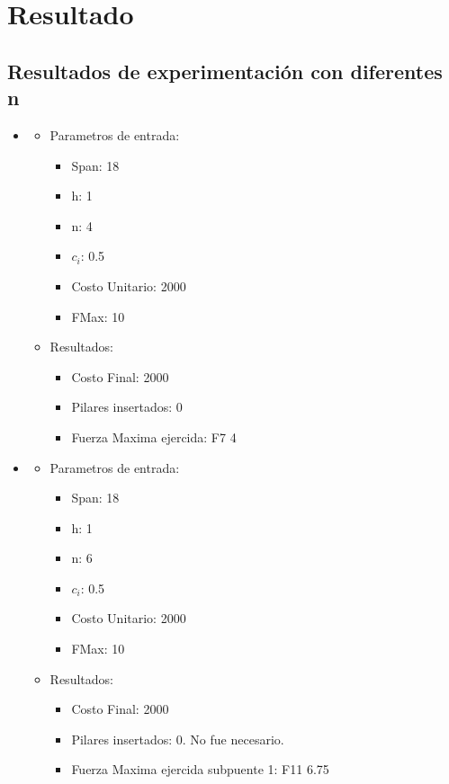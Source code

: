 \section{Resultado}
\subsection{Resultados de experimentaci\'on con diferentes n}
\begin{itemize}
\item
  \begin{itemize}
    \item Parametros de entrada:
	  \begin{itemize}
	    \item Span: 18
	    \item h: 1
	    \item n: 4
	    \item $c_i$: 0.5
	    \item Costo Unitario: 2000
	    \item FMax: 10
	  \end{itemize}
      \item Resultados:
	  \begin{itemize}
	    \item Costo Final: 2000
	    \item Pilares insertados: 0
	    \item Fuerza Maxima ejercida: F7 4
	  \end{itemize}
      \end{itemize} 
\item 
    \begin{itemize}
    \item Parametros de entrada:
	  \begin{itemize}
	    \item Span: 18
	    \item h: 1
	    \item n: 6
	    \item $c_i$: 0.5
	    \item Costo Unitario: 2000
	    \item FMax: 10
	  \end{itemize}
      \item Resultados:
	  \begin{itemize}
	    \item Costo Final: 2000
	    \item Pilares insertados: 0. No fue necesario.
	    \item Fuerza Maxima ejercida subpuente 1: F11 6.75

\end{itemize}
\end{itemize}
\end{itemize}
